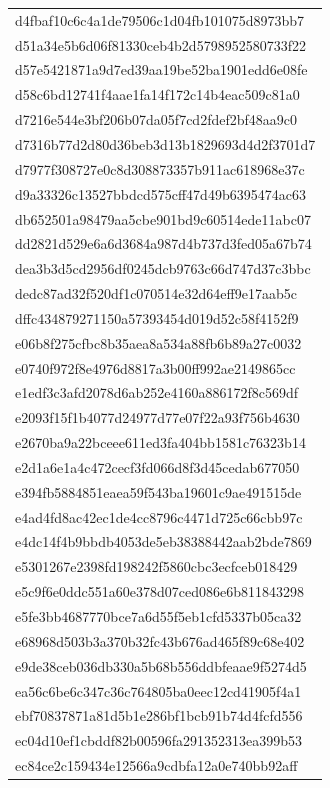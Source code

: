 \begin{tabular}{l}
d4fbaf10c6c4a1de79506c1d04fb101075d8973bb7 \\
d51a34e5b6d06f81330ceb4b2d5798952580733f22 \\
d57e5421871a9d7ed39aa19be52ba1901edd6e08fe \\
d58c6bd12741f4aae1fa14f172c14b4eac509c81a0 \\
d7216e544e3bf206b07da05f7cd2fdef2bf48aa9c0 \\
d7316b77d2d80d36beb3d13b1829693d4d2f3701d7 \\
d7977f308727e0c8d308873357b911ac618968e37c \\
d9a33326c13527bbdcd575cff47d49b6395474ac63 \\
db652501a98479aa5cbe901bd9c60514ede11abc07 \\
dd2821d529e6a6d3684a987d4b737d3fed05a67b74 \\
dea3b3d5cd2956df0245dcb9763c66d747d37c3bbc \\
dedc87ad32f520df1c070514e32d64eff9e17aab5c \\
dffc434879271150a57393454d019d52c58f4152f9 \\
e06b8f275cfbc8b35aea8a534a88fb6b89a27c0032 \\
e0740f972f8e4976d8817a3b00ff992ae2149865cc \\
e1edf3c3afd2078d6ab252e4160a886172f8c569df \\
e2093f15f1b4077d24977d77e07f22a93f756b4630 \\
e2670ba9a22bceee611ed3fa404bb1581c76323b14 \\
e2d1a6e1a4c472cecf3fd066d8f3d45cedab677050 \\
e394fb5884851eaea59f543ba19601c9ae491515de \\
e4ad4fd8ac42ec1de4cc8796c4471d725c66cbb97c \\
e4dc14f4b9bbdb4053de5eb38388442aab2bde7869 \\
e5301267e2398fd198242f5860cbc3ecfceb018429 \\
e5c9f6e0ddc551a60e378d07ced086e6b811843298 \\
e5fe3bb4687770bce7a6d55f5eb1cfd5337b05ca32 \\
e68968d503b3a370b32fc43b676ad465f89c68e402 \\
e9de38ceb036db330a5b68b556ddbfeaae9f5274d5 \\
ea56c6be6c347c36c764805ba0eec12cd41905f4a1 \\
ebf70837871a81d5b1e286bf1bcb91b74d4fcfd556 \\
ec04d10ef1cbddf82b00596fa291352313ea399b53 \\
ec84ce2c159434e12566a9cdbfa12a0e740bb92aff \\

\end{tabular}
